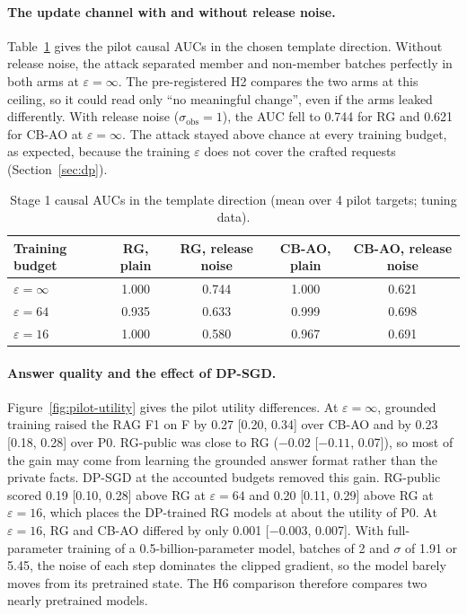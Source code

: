 \documentclass[11pt]{article}
\begin{document}
\paragraph{The update channel with and without release noise.} Table~\ref{tab:pilot-causal} gives the pilot causal AUCs in the chosen template direction. Without release noise, the attack separated member and non-member batches perfectly in both arms at $\varepsilon=\infty$. The pre-registered H2 compares the two arms at this ceiling, so it could read only ``no meaningful change'', even if the arms leaked differently. With release noise ($\sigma_{\mathrm{obs}}=1$), the AUC fell to 0.744 for RG and 0.621 for CB-AO at $\varepsilon=\infty$. The attack stayed above chance at every training budget, as expected, because the training $\varepsilon$ does not cover the crafted requests (Section~\ref{sec:dp}).

\begin{table}[htbp]
\centering
\caption{Stage 1 causal AUCs in the template direction (mean over 4 pilot targets; tuning data).}\label{tab:pilot-causal}
\small
\begin{tabular}{@{}lcccc@{}}
\toprule
Training budget & RG, plain & RG, release noise & CB-AO, plain & CB-AO, release noise \\
\midrule
$\varepsilon=\infty$ & 1.000 & 0.744 & 1.000 & 0.621 \\
$\varepsilon=64$ & 0.935 & 0.633 & 0.999 & 0.698 \\
$\varepsilon=16$ & 1.000 & 0.580 & 0.967 & 0.691 \\
\bottomrule
\end{tabular}
\end{table}

\paragraph{Answer quality and the effect of DP-SGD.} Figure~\ref{fig:pilot-utility} gives the pilot utility differences. At $\varepsilon=\infty$, grounded training raised the RAG F1 on F by 0.27 [0.20, 0.34] over CB-AO and by 0.23 [0.18, 0.28] over P0. RG-public was close to RG ($-0.02$ [$-0.11$, 0.07]), so most of the gain may come from learning the grounded answer format rather than the private facts. DP-SGD at the accounted budgets removed this gain. RG-public scored 0.19 [0.10, 0.28] above RG at $\varepsilon=64$ and 0.20 [0.11, 0.29] above RG at $\varepsilon=16$, which places the DP-trained RG models at about the utility of P0. At $\varepsilon=16$, RG and CB-AO differed by only 0.001 [$-0.003$, 0.007]. With full-parameter training of a 0.5-billion-parameter model, batches of 2 and $\sigma$ of 1.91 or 5.45, the noise of each step dominates the clipped gradient, so the model barely moves from its pretrained state. The H6 comparison therefore compares two nearly pretrained models.
\end{document}
